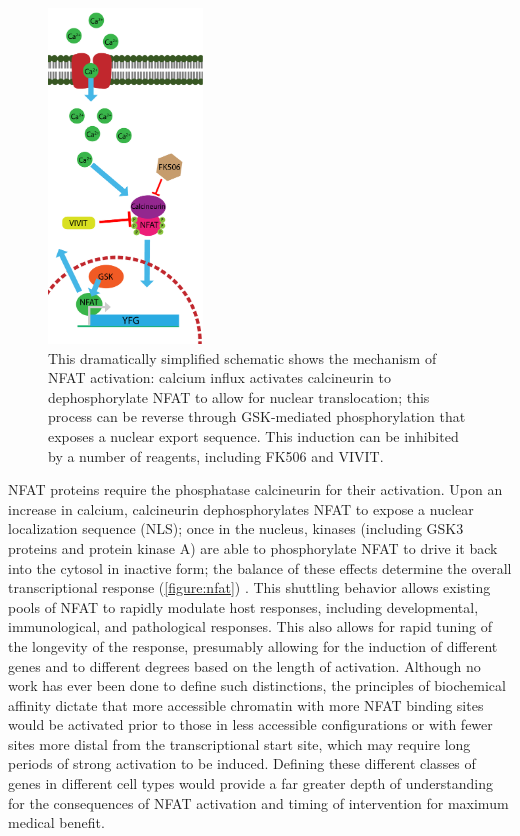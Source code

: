 \begin{figure}
\centering
\includegraphics[height=3.5in]{images/nfatact.pdf}
\caption{This dramatically simplified schematic shows the mechanism of NFAT activation: calcium influx activates calcineurin to dephosphorylate NFAT to allow for nuclear translocation; this process can be reverse through GSK\hyp{}mediated phosphorylation that exposes a nuclear export sequence. This induction can be inhibited by a number of reagents, including FK506 and VIVIT.}
\label{figure:nfat}
\end{figure}

NFAT proteins require the phosphatase calcineurin for their activation. Upon an increase in calcium, calcineurin dephosphorylates NFAT to expose a nuclear localization sequence (NLS); once in the nucleus, kinases (including GSK3 proteins and protein kinase A) are able to phosphorylate NFAT to drive it back into the cytosol in inactive form; the balance of these effects determine the overall transcriptional response (\autoref{figure:nfat}) \citep{Crabtree2002}. This shuttling behavior allows existing pools of NFAT to rapidly modulate host responses, including developmental, immunological, and pathological responses. This also allows for rapid tuning of the longevity of the response, presumably allowing for the induction of different genes and to different degrees based on the length of activation. Although no work has ever been done to define such distinctions, the principles of biochemical affinity dictate that more accessible chromatin with more NFAT binding sites would be activated prior to those in less accessible configurations or with fewer sites more distal from the transcriptional start site, which may require long periods of strong activation to be induced. Defining these different classes of genes in different cell types would provide a far greater depth of understanding for the consequences of NFAT activation and timing of intervention for maximum medical benefit.

